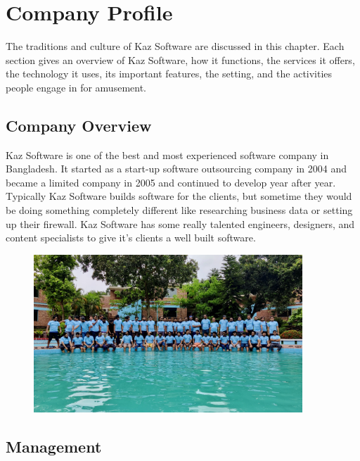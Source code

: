 \chapter{Company Profile}

The traditions and culture of Kaz Software are discussed in this chapter.
Each section gives an overview of Kaz Software, how it functions, the services it offers, the technology it uses, its important features, the setting, and the activities people engage in for amusement.

\section{Company Overview}

Kaz Software is one of the best and most experienced software company in Bangladesh.
It started as a start-up software outsourcing company in 2004 and became a limited company in 2005 and continued to develop year after year.
Typically Kaz Software builds software for the clients, but sometime they would be doing something completely different like researching business data or setting up their firewall.
Kaz Software has some really talented engineers, designers, and content specialists to give it's clients a well built software.

\begin{figure}[h]
    \begin{center}
        \includegraphics[width=0.9\textwidth]{images/Chapter2/cto_tour.jpeg}
        \label{fig:CTO_Tour}
    \end{center}
\end{figure}

\section{Management}

